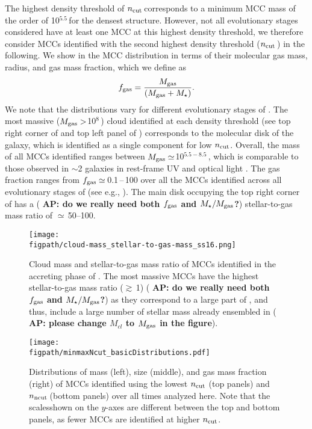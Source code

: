 \IfFileExists{emulateapjlegacy.cls}{\documentclass[iop]{emulateapjlegacy}}{\documentclass[iop]{emulateapj}}
\newcommand{\AP}[1]{({\bf \color{apcolor} AP: #1})}
\def\figpath{./Fig}
\begin{document}
The highest density threshold of $n_{\rm cut}$\,\cc corresponds to a minimum MCC mass of the order of 10$^{5.5}$\,\Msun for the densest structure. However, not all evolutionary stages considered have at least one MCC at this highest density threshold,  we therefore consider MCCs identified with the second highest density threshold ($n_{\rm cut}$\,\cc) in the following. We show in  the MCC distribution in terms of their molecular gas mass, radius, and gas mass fraction, which we define as
\begin{equation}
f_{\rm gas} = \frac{M_{\rm gas}} {\left(M_{\rm gas} + M_\star\right)}.
\end{equation}
%
We note that the distributions vary for different evolutionary stages of \flower.
%
The most massive ($M_{\rm gas}>$10$^8$\,\Msun) cloud identified at each density threshold (see top right corner of  and top left panel of ) corresponds to the molecular disk of the galaxy, which is identified as a single component for low $n_{\rm cut}$.
%
Overall, the mass of all MCCs identified ranges between $M_{\rm gas}\simeq$10$^{5.5-8.5}$\,\Msun, which is comparable to those observed in \z$\sim$2 galaxies in rest-frame UV and optical light \citep{Elmegreen07a, Elmegreen09a}. The gas fraction ranges from $f_{\rm gas} \simeq$\,0.1\,--\,100 over all the MCCs identified across all evolutionary stages of \flower (see e.g., ). The main disk occupying the top right corner of  has a \AP{do we really need both $f_{\rm gas}$ and $M_\star/M_{\rm gas}$?} stellar-to-gas mass ratio of $\simeq$\,50--100.

\begin{figure}
\centering
\texttt{[image: \\figpath/cloud-mass\_stellar-to-gas-mass\_ss16.png]}
\caption{Cloud mass and stellar-to-gas mass ratio of MCCs identified in the accreting phase of \flower.
The most massive MCCs have the highest stellar-to-gas mass ratio ($\gtrsim$\,1) \AP{do we really need both $f_{\rm gas}$ and $M_\star/M_{\rm gas}$?} as they correspond to a large part of \flower, and thus,
include a large number of stellar mass already ensembled in \flower \AP{please change $M_{cl}$ to $M_{\rm gas}$ in the figure}.
\label{fig:stellarRatio16}}
\end{figure}


\begin{figure*}[htbp]
\centering
\texttt{[image: \\figpath/minmaxNcut\_basicDistributions.pdf]}
\caption{Distributions of mass (left), size (middle), and gas mass
  fraction (right) of MCCs identified using the lowest $n_{\rm cut}$
  (top panels) and $n_{\rm ncut}$\,\cc (bottom panels)
 over all times analyzed here.
Note that the scalesshown on the $y$-axes are different between the top
and bottom panels, as fewer MCCs are identified at higher $n_{\rm
  cut}$.
\label{fig:dist}}
\end{figure*}
\end{document}
